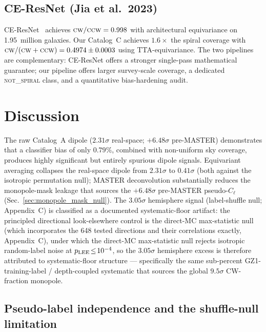 \documentclass[aps,prd,twocolumn,superscriptaddress,preprintnumbers,nofootinbib,longbibliography,floatfix]{revtex4-2}
\newcommand{\CW}{\textsc{cw}}
\newcommand{\CCW}{\textsc{ccw}}
\newcommand{\NS}{\textsc{not\_spiral}}
\newcommand{\sigmaunit}{\sigma}
\begin{document}
\subsection{CE-ResNet (Jia et al.\ 2023)}

CE-ResNet~\cite{Jia:2023} achieves $\CW/\CCW=0.998$ with architectural equivariance on 1.95~million galaxies. Our Catalog~C achieves $1.6\times$ the spiral coverage with $\CW/(\CW+\CCW)=0.4974\pm0.0003$ using TTA-equivariance. The two pipelines are complementary: CE-ResNet offers a stronger single-pass mathematical guarantee; our pipeline offers larger survey-scale coverage, a dedicated \NS{} class, and a quantitative bias-hardening audit.

\section{Discussion}
\label{sec:discussion}

The raw Catalog~A dipole ($2.31\sigmaunit$ real-space; $+6.48\sigmaunit$ pre-MASTER) demonstrates that a classifier bias of only $0.79\%$, combined with non-uniform sky coverage, produces highly significant but entirely spurious dipole signals. Equivariant averaging collapses the real-space dipole from $2.31\sigmaunit$ to $0.41\sigmaunit$ (both against the isotropic permutation null); MASTER deconvolution substantially reduces the monopole-mask leakage that sources the $+6.48\sigmaunit$ pre-MASTER pseudo-$C_\ell$ (Sec.~\ref{sec:monopole_mask_null}). The $3.05\sigmaunit$ hemisphere signal (label-shuffle null; Appendix~C) is classified as a documented systematic-floor artifact: the principled directional look-elsewhere control is the direct-MC max-statistic null (which incorporates the 648 tested directions and their correlations exactly, Appendix~C), under which the direct-MC max-statistic null rejects isotropic random-label noise at $p_{\rm LEE}\!\le\!10^{-4}$, so the $3.05\sigmaunit$ hemisphere excess is therefore attributed to systematic-floor structure — specifically the same sub-percent GZ1-training-label / depth-coupled systematic that sources the global $9.5\sigmaunit$ CW-fraction monopole.

\subsection{Pseudo-label independence and the shuffle-null limitation}
\label{sec:pseudolabel_independence}
\end{document}
